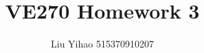 \documentclass{article}
\title{VE270 Homework 3}
\author{Liu Yihao 515370910207}
\date{}
\begin{document}
\maketitle

\section{}
\end{document}
